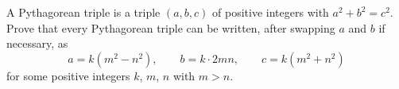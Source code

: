 A Pythagorean triple is a triple $(a,b,c)$ of positive integers with $a^2+b^2=c^2$. Prove that every Pythagorean triple can be written, after swapping $a$ and $b$ if necessary, as
\[a=k\left(m^2-n^2\right),\qquad b=k\cdot2mn,\qquad c=k\left(m^2+n^2\right)\]
for some positive integers $k$, $m$, $n$ with $m>n$.
